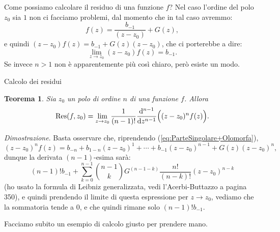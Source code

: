 \documentclass[11pt]{book}
\makeatletter
\theoremstyle{Definizione}
\theoremstyle{TeoremaProposizioneLemmaCorollarioCongettura}
\newtheorem{myteo}{Teorema}[section]
\theoremstyle{OsservazioneNotaEsempio}
\renewenvironment{proof}[1][\proofname]{\par
  \normalfont \topsep6\p@\@plus6\p@\relax
  \trivlist
  \item[\hskip\labelsep
        \itshape
    #1\@addpunct{.}]\ignorespaces
}{%
  \endtrivlist\@endpefalse
}
\renewenvironment{proof}{\textsl{Dimostrazione}.}{}
\renewcommand{\d}{\mathrm{d}}
\newcommand{\Res}{\textup{Res}}
\makeatother
\begin{document}
Come possiamo calcolare il residuo di una funzione $f$? Nel caso l'ordine del polo $z_0$ sia $1$ non ci facciamo problemi, dal momento che in tal caso avremmo:
$$
f(z) = \frac{b_{-1}}{(z-z_0)} + G(z),
$$
e quindi $(z-z_0)f(z) = b_{-1}+G(z)(z-z_0)$, che ci porterebbe a dire:
$$
\lim_{z \to z_0} (z-z_0)f(z) = b_{-1}.
$$
Se invece $n > 1$ non è apparentemente più così chiaro, però esiste un modo.
\begin{boxteo}{Calcolo dei residui}
\begin{myteo}\label{teo:CalcoloDeiResidui}
Sia $z_0$ un polo di ordine $n$ di una funzione $f$. Allora
$$
\Res(f,z_0) = \lim_{z \to z_0} \frac{1}{(n-1)!}\frac{\d^{n-1}}{\d z^{n-1}}\Big((z-z_0)^n f(z)\Big).
$$
\end{myteo}
\tcblower
\begin{proof}
Basta osservare che, riprendendo (\ref{eq:ParteSingolare+Olomorfa}),
$$
(z-z_0)^n f(z) = b_{-n} + b_{1-n}(z-z_0)^1 + \cdots + b_{-1}(z-z_0)^{n-1} + G(z)(z-z_0)^{n},
$$
dunque la derivata $(n-1)$-esima sarà:
$$
(n-1)!b_{-1} + \sum_{k = 0}^{n-1} \binom{n-1}{k} G^{(n-1-k)}\frac{n!}{(n-k)!}(z-z_0)^{n-k}
$$
(ho usato la formula di Leibniz generalizzata, vedi l'Acerbi-Buttazzo a pagina 350), e quindi prendendo il limite di questa espressione per $z \to z_0$, vediamo che la sommatoria tende a $0$, e che quindi rimane solo $(n-1)!b_{-1}$.
\end{proof}
\end{boxteo}
\noindent
Facciamo subito un esempio di calcolo giusto per prendere mano.
\end{document}
